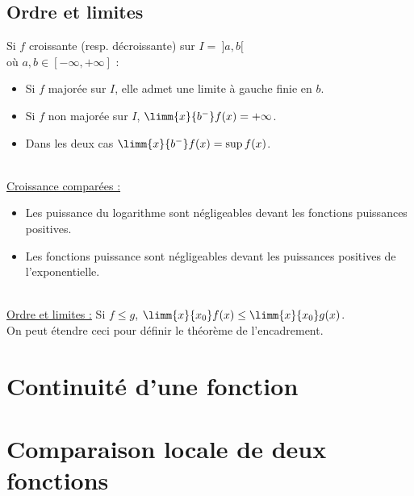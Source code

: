 {    \subsection{Ordre et limites}\label{subsec:ordre-et-limites}
    Si $f$ croissante (resp. décroissante) sur $I =\ ]a, b[$\\
    où $a, b \in [-\infty, +\infty]$ :
    \begin{itemize}
        \item Si $f$ majorée sur $I$, elle admet une limite à gauche finie en $b$.
        \item Si $f$ non majorée sur $I$, $\limm{x}{b^-} f(x) = +\infty$.
        \item Dans les deux cas $\limm{x}{b^-} f(x) = \sup f(x)$.
    \end{itemize}
    \phantom{s}\\
    \underline{Croissance comparées :}
    \begin{itemize}
        \item Les puissance du logarithme sont négligeables devant les fonctions puissances positives.
        \item Les fonctions puissance sont négligeables devant les puissances positives de l'exponentielle.
    \end{itemize}
    \phantom{s}\\
    \underline{Ordre et limites :}
    Si $f \le g$, $\limm{x}{x_0} f(x) \le \limm{x}{x_0} g(x)$.\\
    On peut étendre ceci pour définir le théorème de l'encadrement.
}


\section{Continuité d'une fonction}\label{sec:continuite-d'une-fonction}


\section{Comparaison locale de deux fonctions}\label{sec:comparaison-locale-de-deux-fonctions}







